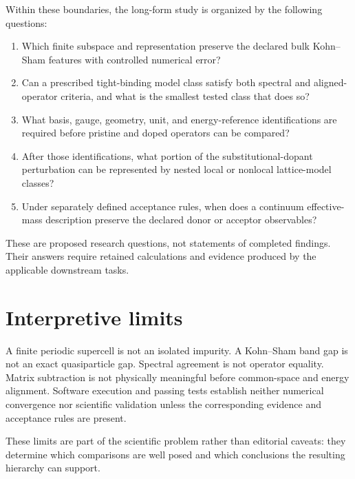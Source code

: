 Within these boundaries, the long-form study is organized by the following
questions:
\begin{enumerate}
    \item Which finite subspace and representation preserve the declared bulk
          Kohn--Sham features with controlled numerical error?
    \item Can a prescribed tight-binding model class satisfy both spectral and
          aligned-operator criteria, and what is the smallest tested class that
          does so?
    \item What basis, gauge, geometry, unit, and energy-reference
          identifications are required before pristine and doped operators can
          be compared?
    \item After those identifications, what portion of the
          substitutional-dopant perturbation can be represented by nested local
          or nonlocal lattice-model classes?
    \item Under separately defined acceptance rules, when does a continuum
          effective-mass description preserve the declared donor or acceptor
          observables?
\end{enumerate}

These are proposed research questions, not statements of completed findings.
Their answers require retained calculations and evidence produced by the
applicable downstream tasks.

\section{Interpretive limits}

A finite periodic supercell is not an isolated impurity. A Kohn--Sham band gap
is not an exact quasiparticle gap. Spectral agreement is not operator equality.
Matrix subtraction is not physically meaningful before common-space and
energy alignment. Software execution and passing tests establish neither
numerical convergence nor scientific validation unless the corresponding
evidence and acceptance rules are present.

These limits are part of the scientific problem rather than editorial caveats:
they determine which comparisons are well posed and which conclusions the
resulting hierarchy can support.
